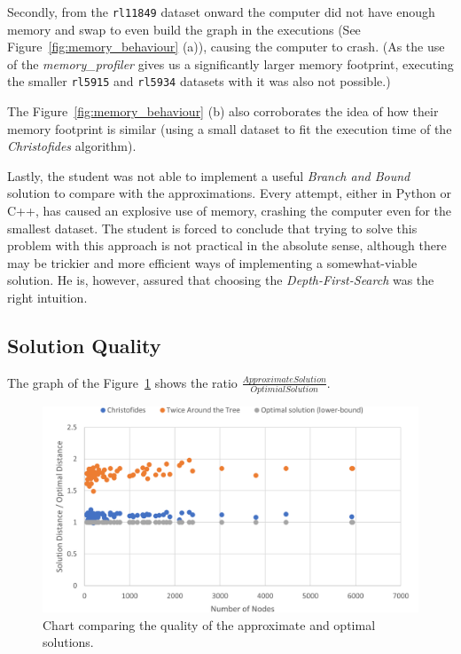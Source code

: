 \documentclass[12pt]{article}
\begin{document}

Secondly, from the \texttt{rl11849} dataset onward the computer did not have enough memory and swap to 
even build the graph in the executions (See Figure~\ref{fig:memory_behaviour} 
(a)), causing the computer to crash\footnotemark. 
(As the use of the \textit{memory\_profiler} gives us a significantly larger memory footprint, executing the smaller 
\texttt{rl5915} and \texttt{rl5934} datasets with it was also not possible.)


The Figure~\ref{fig:memory_behaviour} (b) also corroborates the idea of how their memory footprint is similar 
(using a small dataset to fit the execution time of the \textit{Christofides} algorithm).

Lastly, the student was not able to implement a useful \textit{Branch and Bound} solution to compare with the approximations. 
Every attempt, either in Python or C++, has caused an explosive use of memory, crashing the computer 
even for the smallest dataset. The student is forced to conclude that trying to solve this problem with this 
approach is not practical in the absolute sense, although there may be trickier and more efficient ways of 
implementing a somewhat-viable solution. He is, however, assured that choosing the \textit{Depth-First-Search} was the right intuition.

\subsection{Solution Quality} \label{sec:exp_quality}

The graph of the Figure~\ref{fig:quality_ratio} shows the ratio $\frac{Approximate Solution}{Optimial Solution}$.

\begin{figure}[ht]
\centering
\includegraphics[height=.325\textheight]{images/quality_ratio.png}
\caption{Chart comparing the quality of the approximate and optimal solutions.}
\label{fig:quality_ratio}
\end{figure}
\end{document}
